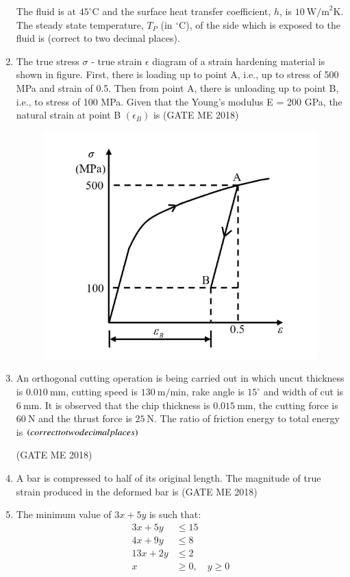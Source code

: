 \documentclass[journal]{IEEEtran}
\numberwithin{equation}{enumi}
\numberwithin{figure}{enumi}
\begin{document}
\begin{enumerate}
  The fluid is at $45^\circ\text{C}$ and the surface heat transfer coefficient, $h$, is $10~\text{W/m}^2\text{K}$.  
  The steady state temperature, $T_P$ (in $^\circ\text{C}$), of the side which is exposed to the fluid is  
  \underline{\hspace{3cm}} (correct to two decimal places).

  \item The true stress $\sigma$ - true strain $\epsilon$ diagram of a strain hardening material is shown in figure.
First, there is loading up to point A, i.e., up to stress of 500 MPa and strain of 0.5. Then from
point A, there is unloading up to point B, i.e., to stress of 100 MPa. Given that the Young's
modulus E = 200 GPa, the natural strain at point B $(\epsilon_B)$ is
 \hfill{(GATE ME 2018)}
 \begin{figure}[H]
\centering
    \includegraphics[width = 0.6\columnwidth]{figs/fig3.17.png}
    \caption*{}
    \label{fig:Q48}
    \end{figure}

\item An orthogonal cutting operation is being carried out in which uncut thickness is $0.010~\text{mm}$, cutting speed is $130~\text{m/min}$, rake angle is $15^\circ$ and width of cut is $6~\text{mm}$. It is observed that the chip thickness is $0.015~\text{mm}$, the cutting force is $60~\text{N}$ and the thrust force is $25~\text{N}$. The ratio of friction energy to total energy is $\left(correct to two decimal places\right)$

\hfill{(GATE ME 2018)}

\item A bar is compressed to half of its original length. The magnitude of true strain produced in the deformed bar is 
    \hfill{(GATE ME 2018)}
 \item The minimum value of $3x + 5y$ is such that:
    \begin{align*}
        3x + 5y &\le 15 \\
        4x + 9y &\le 8 \\
        13x + 2y &\le 2 \\
        x &\ge 0, \quad y \ge 0
    \end{align*}
     

\end{enumerate}
\end{document}
